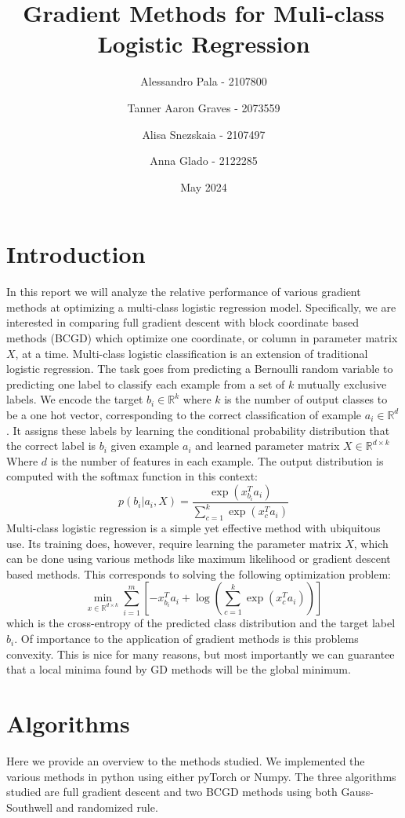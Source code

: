 \documentclass{article}
\title{Gradient Methods for Muli-class Logistic Regression}
\author{Alessandro Pala - 2107800 \and 
Tanner Aaron Graves - 2073559\and 
Alisa Snezskaia - 2107497\and
Anna Glado - 2122285}
\date{May 2024}
\begin{document}
\maketitle

\section{Introduction}
In this report we will analyze the relative performance of various gradient methods at optimizing a multi-class logistic regression model. Specifically, we are interested in comparing full gradient descent with block coordinate based methods (BCGD) which optimize one coordinate, or column in parameter matrix $X$, at a time. 
Multi-class logistic classification is an extension of traditional logistic regression. The task goes from predicting a Bernoulli random variable to predicting one label to classify each example from a set of $k$ mutually exclusive labels. We encode the target $b_i \in \mathbb{R}^k$ where $k$ is the number of output classes to be a one hot vector, corresponding to the correct classification of example $a_i \in \mathbb{R}^d$. It assigns these labels by learning the conditional probability distribution that the correct label is $b_i$ given example $a_i$ and learned parameter matrix $X \in \mathbb{R}^{d \times k}$ Where $d$ is the number of features in each example. The output distribution is computed with the softmax function in this context: 
$$p(b_i|a_i, X) = \frac{\exp(x_{b_i}^T a_i)}{\sum_{c=1}^k\exp(x_c^Ta_i)}$$
Multi-class logistic regression is a simple yet effective method with ubiquitous use. Its training does, however, require learning the parameter matrix $X$, which can be done using various methods like maximum likelihood or gradient descent based methods. This corresponds to solving the following optimization problem:
$$\min_{x\in\mathbb{R}^{d\times k}} \sum\limits_{i=1}^{m}[-x^T_{b_i}a_{i}+ \log(\sum\limits_{c=1}^k\exp(x_c^{T}a_i))]$$
which is the cross-entropy of the predicted class distribution and the target label $b_i$. Of importance to the application of gradient methods is this problems convexity. This is nice for many reasons, but most importantly we can guarantee that a local minima found by GD methods will be the global minimum.

\section{Algorithms}
Here we provide an overview to the methods studied. We implemented the various methods in python using either pyTorch or Numpy. The three algorithms studied are full gradient descent and two BCGD methods using both Gauss-Southwell and randomized rule.  
\end{document}
